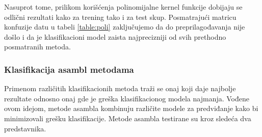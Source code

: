 \documentclass[a4paper]{article}
\begin{document}
Nasuprot tome, prilikom korišćenja polinomijalne kernel funkcije dobijaju se odlični rezultati kako za trening tako i za test skup. Posmatrajući matricu konfuzije datu u tabeli \ref{table:poli} zaključujemo da do preprilagođavanja nije došlo i da je klasifikacioni model zaista najprecizniji od svih prethodno posmatranih metoda.

\subsubsection{Klasifikacija asambl metodama}
\label{asambl}

Primenom različitih klasifikacionih metoda traži se onaj koji daje najbolje rezultate odnosno onaj gde je greška klasifikacionog modela najmanja. Vođene ovom idejom, metode asambla kombinuju različite modele za predviđanje kako bi minimizovali grešku klasifikacije. Metode asambla testirane su kroz sledeća dva predstavnika.
\end{document}
